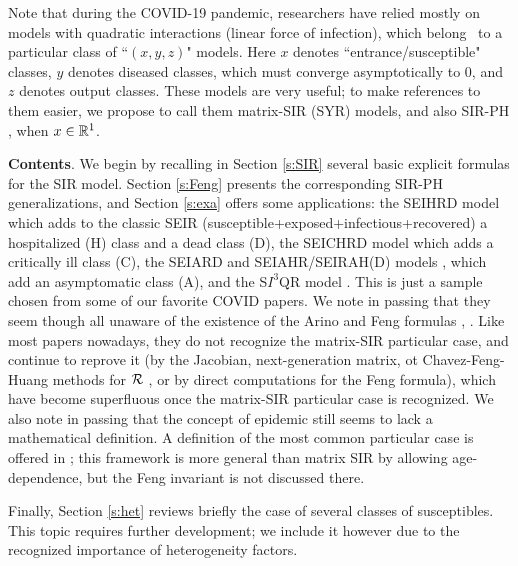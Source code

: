 \fi

 Note that during the COVID-19 pandemic, researchers have relied mostly on models with  quadratic interactions (linear force of infection), which belong \frt\ to a particular class \cite{Arino,Andr,Riano,Fre20} of ``$(x,y,z)$" models.  Here $x$ denotes ``entrance/susceptible" classes, $y$ denotes diseased classes, which must converge asymptotically to $0$,  and $z$ denotes output classes. These models are very useful; to make references to them easier, we propose to call them matrix-SIR (SYR)  models, and  also SIR-PH \cite{Riano}, when $x \in \mathbb{R}^1$.





{\bf Contents}. We begin by recalling in Section \ref{s:SIR} several  basic explicit formulas  for the SIR model.  Section \ref{s:Feng} presents the corresponding SIR-PH generalizations, and Section \ref {s:exa} offers some applications: the SEIHRD model
\cite{ivorra2017stability,Palmer,pazos2020control,nave2020theta,ramos2021simple} which adds to the classic SEIR (susceptible+exposed+infectious+recovered)  a  hospitalized (H) class  and a dead class (D), the SEICHRD model \cite{Kantner}
which adds a critically ill class (C),
the SEIARD  \cite{de2020data} and SEIAHR/SEIRAH(D) models \cite{deng2021extended,otoo2021estimating,wang2020evolving,kucharski2020early,hayhoe2020data,khatua2020fuzzy,prague2020population}, which add an asymptomatic class (A), and the S$I^{3}$QR model \cite{shaw2021reproductive}.
This is just a sample chosen from some of our favorite COVID papers. We note in passing that they seem though all unaware of the existence of the Arino and Feng formulas ,  . Like most  papers nowadays, they do not recognize the matrix-SIR particular case, and    continue to reprove it   (by the Jacobian, next-generation matrix, ot Chavez-Feng-Huang methods for $\mathcal R$ \cite{Mart}, or by direct computations for the Feng formula), which have become  superfluous once the matrix-SIR particular case is recognized. We also note in passing that the concept of epidemic still seems to lack a  mathematical definition. A definition of the most common particular case is offered in \cite{Breda}; this framework is  more general  than matrix SIR by allowing age-dependence, but the Feng invariant is not discussed  there.


Finally, Section \ref {s:het}  reviews briefly the
case of several classes of susceptibles. This topic requires further development; we include it however due to the recognized importance of heterogeneity factors. %
